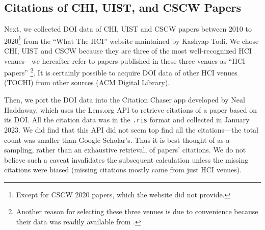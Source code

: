 \subsection{Citations of CHI, UIST, and CSCW Papers}
% 
Next, we collected DOI data of CHI, UIST and CSCW papers between 2010 to 2020\footnote{Except for CSCW 2020 papers, which the website did not provide.} from the ``What The HCI'' \cite{WhatTheH50:online} website maintained by Kashyap Todi.
We chose CHI, UIST and CSCW because they are three of the most well-recognized HCI venues---we hereafter refer to papers published in these three venues as ``HCI papers''
\footnote{Another reason for selecting these three venues is due to convenience because their data was readily available from \cite{WhatTheH50:online}.}.
It is certainly possible to acquire DOI data of other HCI venues (\eg TOCHI) from other sources (\eg ACM Digital Library).


Then, we port the DOI data into the Citation Chaser app \cite{citation47:online} developed by Neal Haddaway, which uses the Lens.org API \cite{TheLensF23:online} to retrieve citations of a paper based on its DOI.
All the citation data was in the \texttt{.ris} format and collected in January 2023.
We did find that this API did not seem top find all the citations---the total count was smaller than Google Scholar's.
Thus it is best thought of as a sampling, rather than an exhaustive retrieval, of papers' citations. 
We do not believe such a caveat invalidates the subsequent \xin calculation unless the missing citations were biased (\eg missing citations mostly came from just HCI venues).

